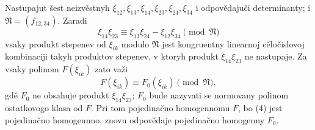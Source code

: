 \documentclass[11pt]{article}
\providecommand{\frN}{\mathfrak N}
\begin{document}
Nastupajut šest neizvěstnyh \(\xi_{12},\xi_{13},\xi_{14},\xi_{23},\xi_{24},\xi_{34}\) i odpovědajuči determinanty; i \(\frN=(f_{12,34})\). Zaradi
\begin{equation}
        \xi_{14}\xi_{23}\equiv \xi_{13}\xi_{24}-\xi_{12}\xi_{34}\pmod{\frN}
\end{equation}
vsaky produkt stepenev od \(\xi_{ik}\) modulo \(\frN\) jest kongruentny linearnoj cěločislovoj kombinaciji takyh produktov stepenev, v ktoryh produkt \(\xi_{14}\xi_{23}\) ne nastupaje. Za vsaky polinom \(F(\xi_{ik})\) zato važi
\begin{equation}
        F(\xi_{ik})\equiv F_0(\xi_{ik})\pmod{\frN},
\end{equation}
gdě \(F_0\) ne obsahuje produkt \(\xi_{14}\xi_{23}\); \(F_0\) bude nazyvati se normovany polinom ostatkovogo klasa od \(F\). Pri tom pojedinačno homogennomu \(F\), bo (4) jest pojedinačno homogennno, znovu odpovědaje pojedinačno homogenny \(F_0\).
\end{document}

